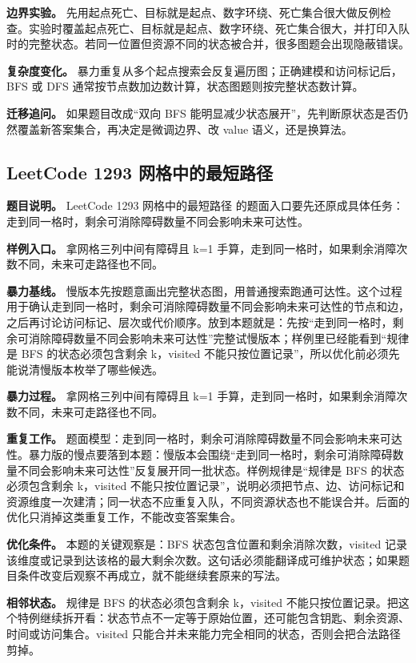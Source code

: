 \textbf{边界实验。} 先用起点死亡、目标就是起点、数字环绕、死亡集合很大做反例检查。实验时覆盖起点死亡、目标就是起点、数字环绕、死亡集合很大，并打印入队时的完整状态。若同一位置但资源不同的状态被合并，很多图题会出现隐蔽错误。

\textbf{复杂度变化。} 暴力重复从多个起点搜索会反复遍历图；正确建模和访问标记后，BFS 或 DFS 通常按节点数加边数计算，状态图题则按完整状态数计算。

\textbf{迁移追问。} 如果题目改成“双向 BFS 能明显减少状态展开”，先判断原状态是否仍然覆盖新答案集合，再决定是微调边界、改 value 语义，还是换算法。

\subsection{LeetCode 1293 网格中的最短路径}

\textbf{题目说明。} LeetCode 1293 网格中的最短路径 的题面入口要先还原成具体任务：走到同一格时，剩余可消除障碍数量不同会影响未来可达性。

\textbf{样例入口。} 拿网格三列中间有障碍且 k=1 手算，走到同一格时，如果剩余消障次数不同，未来可走路径也不同。

\textbf{暴力基线。} 慢版本先按题意画出完整状态图，用普通搜索跑通可达性。这个过程用于确认走到同一格时，剩余可消除障碍数量不同会影响未来可达性的节点和边，之后再讨论访问标记、层次或代价顺序。放到本题就是：先按“走到同一格时，剩余可消除障碍数量不同会影响未来可达性”完整试慢版本；样例里已经能看到“规律是 BFS 的状态必须包含剩余 k，visited 不能只按位置记录”，所以优化前必须先能说清慢版本枚举了哪些候选。

\textbf{暴力过程。} 拿网格三列中间有障碍且 k=1 手算，走到同一格时，如果剩余消障次数不同，未来可走路径也不同。

\textbf{重复工作。} 题面模型：走到同一格时，剩余可消除障碍数量不同会影响未来可达性。暴力版的慢点要落到本题：慢版本会围绕“走到同一格时，剩余可消除障碍数量不同会影响未来可达性”反复展开同一批状态。样例规律是“规律是 BFS 的状态必须包含剩余 k，visited 不能只按位置记录”，说明必须把节点、边、访问标记和资源维度一次建清；同一状态不应重复入队，不同资源状态也不能误合并。后面的优化只消掉这类重复工作，不能改变答案集合。

\textbf{优化条件。} 本题的关键观察是：BFS 状态包含位置和剩余消除次数，visited 记录该维度或记录到达该格的最大剩余次数。这句话必须能翻译成可维护状态；如果题目条件改变后观察不再成立，就不能继续套原来的写法。

\textbf{相邻状态。} 规律是 BFS 的状态必须包含剩余 k，visited 不能只按位置记录。把这个特例继续拆开看：状态节点不一定等于原始位置，还可能包含钥匙、剩余资源、时间或访问集合。visited 只能合并未来能力完全相同的状态，否则会把合法路径剪掉。

